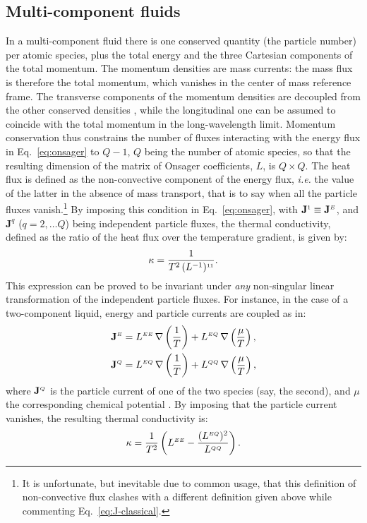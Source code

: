 \subsection{Multi-component fluids} \label{sec:multi-component}
In a multi-component fluid there is one conserved quantity (the particle number) per atomic species, plus the total energy and the three Cartesian components of the total momentum. The momentum densities are mass currents: the mass flux is therefore the total momentum, which vanishes in the center of mass reference frame. The transverse components of the momentum densities are decoupled from the other conserved densities \citep{Foster1975}, while the longitudinal one can be assumed to coincide with the total momentum in the long-wavelength limit. Momentum conservation thus constrains the number of fluxes interacting with the energy flux in Eq.~\eqref{eq:onsager} to $Q-1$, $Q$ being the number of atomic species, so that the resulting dimension of the matrix of Onsager coefficients, $L$, is $Q\times Q$. The heat flux is defined as the non-convective component of the energy flux, \emph{i.e.} the value of the latter in the absence of mass transport, that is to say when all the particle fluxes vanish.\footnote{It is unfortunate, but inevitable due to common usage, that this definition of non-convective flux clashes with a different definition given above while commenting Eq.~\eqref{eq:J-classical}.} By imposing this condition in Eq.~\eqref{eq:onsager}, with $\mathbf J^{\scriptscriptstyle 1} \equiv \mathbf{J}^{\scriptscriptstyle E}$, and $\mathbf{J}^{q}$ ($q =2,\dots Q$) being independent particle fluxes, the thermal conductivity, defined as the ratio of the heat flux over the temperature gradient, is given by:
\begin{equation}
\kappa = \frac{1}{T^2 \,(L^{-1})^{\smallone\smallone}}. \label{eq:multi_kappa}
\end{equation}
This expression can be proved to be invariant under \textit{any} non-singular linear transformation of the independent particle fluxes. For instance, in the case of a two-component liquid, energy and particle currents are coupled as in:
\begin{equation}
  \begin{aligned}
    \mathbf{J}^\smallE &= L^{\smallE\smallE}\,  \nabla \left (\frac{1}{T} \right ) + L^{\smallE\smallQ} \, \nabla \left (\frac{\mu}{T} \right ), \\
    \mathbf{J}^{\smallQ} &= L^{\smallE\smallQ} \, \nabla \left (\frac{1}{T} \right ) + L^{\smallQ\smallQ} \, \nabla \left (\frac{\mu}{T} \right ), \label{eq:two-comp-constitutive}
  \end{aligned}
\end{equation}
where $\mathbf{J}^{{\scriptscriptstyle Q}}$ is the particle current of one of the two species (say, the second), and $\mu$ the corresponding chemical potential \citep{Sindzingre1990}. By imposing that the particle current vanishes, the resulting thermal conductivity is:
\begin{equation}
  \kappa=\frac{1}{T^2}
  \left( L^{\smallE\smallE} - \frac{(L^{\smallE\smallQ})^2}{L^{\smallQ\smallQ}} \right). \label{eq:two-comp-kappa}
\end{equation}


